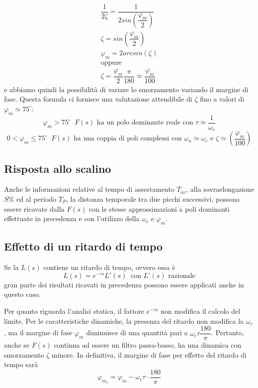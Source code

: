 \documentclass[a4paper]{report}
\begin{document}
\begin{equation}
  \begin{array}{l}
    \dfrac{1}{2 \zeta} = \dfrac{1}{2sin \left( \dfrac{\varphi_m}{2} \right)}\\
    \zeta = sin \left( \dfrac{\varphi_m}{2} \right)\\
    \varphi_m = 2 arc sin(\zeta)\\
    \textrm{oppure}\\
    \zeta = \dfrac{\varphi_m}{2} \dfrac{\pi}{180} \simeq
    \dfrac{\varphi_m}{100}
  \end{array}
\end{equation}
e abbiamo quindi la possibilit\`a di variare lo smorzamento variando il
margine di fase. Questa formula ci fornisce una valutazione
attendibile di $\zeta$ fino a valori di $\varphi_m \simeq
75^{\circ}$:
\[
\varphi_m > 75^{\circ} \;\; F(s) \textrm{ ha un polo dominante reale
  con } \tau \simeq \dfrac{1}{\omega_c}
\]
\[
0 < \varphi_m \leq 75^{\circ} \;\; F(s) \textrm{ ha una coppia di poli
complessi con } \omega_n \simeq \omega_c \textrm{ e } \zeta \simeq
\left(\dfrac{\varphi_m}{100}\right) 
\]

\subsection{Risposta allo scalino}
Anche le informazioni relative al tempo di assestamento $T_{a
  \varepsilon}$, alla sovraelongazione $S\%$ ed al periodo $T_P$, la
distanza temporale tra due picchi successivi, possono essere ricavate
dalla $F(s)$ con le stesse approssimazioni a poli dominanti effettuate
in precedenza e con l'utilizzo della $\omega_c$ e $\varphi_m$.

\subsection{Effetto di un ritardo di tempo}
Se la $L(s)$ contiene un ritardo di tempo, ovvero essa \`e
\[
L(s) = e^{-\tau s} L'(s) \;\; \textrm{con $L'(s)$ razionale}
\]
gran parte dei risultati ricavati in precedenza possono essere
applicati anche in questo caso.

Per quanto riguarda l'analisi statica, il fattore $e^{- \tau s}$ non
modifica il calcolo del limite. Per le caratteristiche dinamiche, la
presenza del ritardo non modifica la $\omega_c$, ma il margine di fase
$\varphi_m$ diminuisce di una quantit\`a pari a $\omega_c \tau
\dfrac{180}{\pi}$. Pertanto, anche se $F(s)$ continua ad essere un
filtro passa-basso, ha una dinamica con smorzamento $\zeta$ minore. In
definitiva, il margine di fase per effetto del ritardo di tempo
sar\`a
\[
\varphi_{m_{\tau}} = \varphi_m - \omega_c \tau \cdot \dfrac{180}{\pi}
\]
\end{document}
